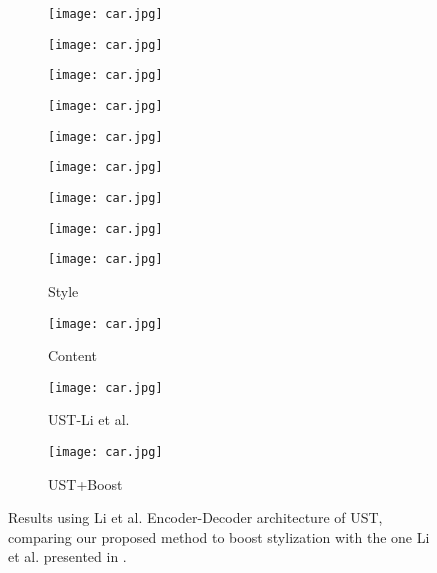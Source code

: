 \begin{figure}[h!]
	\centering
	\begin{subfigure}[b]{0.225\linewidth}
		\texttt{[image: car.jpg]} %
	\end{subfigure}
	\begin{subfigure}[b]{0.225\linewidth}
		\texttt{[image: car.jpg]} %
	\end{subfigure}
	\begin{subfigure}[b]{0.225\linewidth}
		\texttt{[image: car.jpg]} %
	\end{subfigure}
	\begin{subfigure}[b]{0.225\linewidth}
		\texttt{[image: car.jpg]} %
	\end{subfigure}
	\centering
	\begin{subfigure}[b]{0.225\linewidth}
		\texttt{[image: car.jpg]} %
	\end{subfigure}
	\begin{subfigure}[b]{0.225\linewidth}
		\texttt{[image: car.jpg]} %
	\end{subfigure}
	\begin{subfigure}[b]{0.225\linewidth}
		\texttt{[image: car.jpg]} %
	\end{subfigure}
	\begin{subfigure}[b]{0.225\linewidth}
		\texttt{[image: car.jpg]} %
	\end{subfigure}
	\centering
	\begin{subfigure}[b]{0.225\linewidth}
		\texttt{[image: car.jpg]} %
		\caption{Style}
	\end{subfigure}
	\begin{subfigure}[b]{0.225\linewidth}
		\texttt{[image: car.jpg]} %
		\caption{Content}
	\end{subfigure}
	\begin{subfigure}[b]{0.225\linewidth}
		\texttt{[image: car.jpg]} %
		\caption{UST-Li et al. \cite{bib11}}
	\end{subfigure}
	\begin{subfigure}[b]{0.225\linewidth}
		\texttt{[image: car.jpg]} %
		\caption{UST+Boost}
	\end{subfigure}
	\caption{Results using Li et al. \cite{bib11} Encoder-Decoder architecture of UST, comparing our proposed method to boost stylization with the one Li et al. presented in \cite{bib11}.}
	\label{fig:Boost}
\end{figure}
